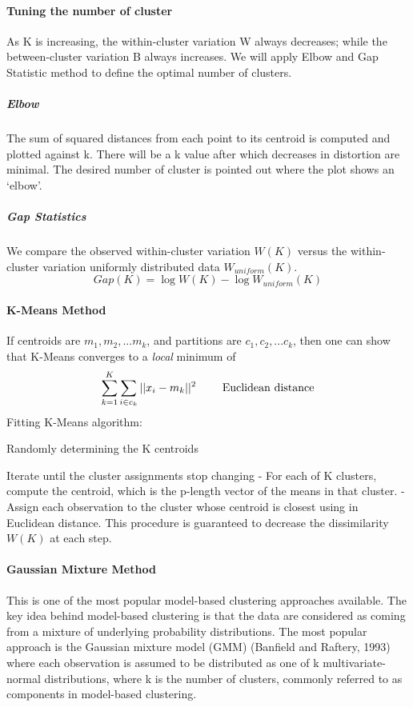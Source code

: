 \documentclass[12pt]{article}
\let\tempone\itemize
\let\temptwo\enditemize
\renewenvironment{itemize}{\tempone\setlength{\itemsep}{0pt}}{\temptwo}
\begin{document}
\paragraph{Tuning the number of cluster}
As K is increasing, the within-cluster variation W always decreases; while the between-cluster variation B always increases. We will apply  Elbow and Gap Statistic method to define the optimal number of clusters. 

\subparagraph{Elbow}
The sum of squared distances from each point to its centroid is computed and plotted against k. There will be a k value after which decreases in distortion are minimal. The desired number of cluster is pointed out where the plot shows an ‘elbow’.

\subparagraph{Gap Statistics}
We compare the observed within-cluster variation $W(K)$ versus the within-cluster variation uniformly distributed data $W_{uniform} (K)$.
\begin{equation}
Gap(K) = \log W(K) - \log W_{uniform}(K)
\end{equation}

\paragraph{K-Means Method}
If centroids are $m_1, m_2, ... m_k$, and partitions are $c_1, c_2, ... c_k$, then one can show that K-Means converges to a {\it local} minimum of 
\[
\sum^K_{k=1} \sum_{i\in c_k} || x_i - m_k ||^2 \ \ \ \ \ \ \ \rm Euclidean \ distance
\]
Fitting K-Means algorithm: 
\begin{itemize}
\item Randomly determining the K centroids
\item Iterate until the cluster assignments stop changing 
    \subitem - For each of K clusters, compute the centroid, which is the p-length vector of the means in that cluster.
    \subitem - Assign each observation to the cluster whose centroid is closest using in Euclidean distance.
    \subitem This procedure is guaranteed to decrease the dissimilarity $W(K)$ at each step. 
\end{itemize}
\paragraph{Gaussian Mixture Method}
This is one of the most popular model-based clustering approaches available. The key idea behind model-based clustering is that the data are considered as coming from a mixture of underlying probability distributions. The most popular approach is the Gaussian mixture model (GMM) (Banfield and Raftery, 1993) where each observation is assumed to be distributed as one of k multivariate-normal distributions, where k is the number of clusters, commonly referred to as components in model-based clustering.
\end{document}
